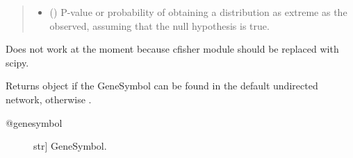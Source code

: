 \documentclass[letterpaper,10pt,english]{sphinxmanual}
\begin{document}
\begin{fulllineitems}
\begin{fulllineitems}
\begin{quote}
\begin{description}
\begin{itemize}
\item {} 
() \textendash{} P-value or probability of obtaining a
distribution as extreme as the observed, assuming that the
null hypothesis is true.

\end{itemize}


\end{description}\end{quote}

\end{fulllineitems}


\begin{fulllineitems}
\label{\detokenize{reference:pypath.main.PyPath.geneset_enrichment}}
Does not work at the moment because cfisher module should be
replaced with scipy.

\end{fulllineitems}


\begin{fulllineitems}
\label{\detokenize{reference:pypath.main.PyPath.genesymbol}}
Returns  object if the GeneSymbol
can be found in the default undirected network,
otherwise .
\begin{description}
\item[{@genesymbol}] \leavevmode{[}str{]}
GeneSymbol.

\end{description}

\end{fulllineitems}



\end{fulllineitems}
\end{document}
